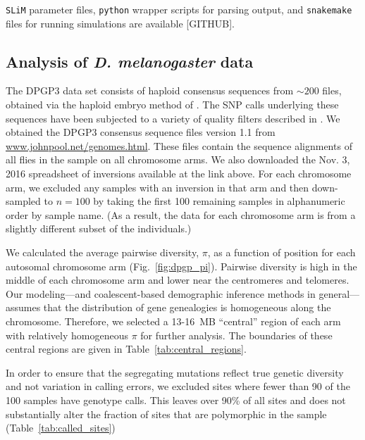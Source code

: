 \documentclass[11pt, letterpaper]{article}   	%
\newcommand{\fig}[1]{Fig.~\ref{#1}}
\begin{document}
\texttt{SLiM} parameter files, \texttt{python} wrapper scripts for parsing output, and \texttt{snakemake} files for running simulations are available [GITHUB].

\subsection*{Analysis of \textit{D. melanogaster} data}

The DPGP3 data set consists of haploid consensus sequences from $\sim 200$ files, obtained via the haploid embryo method of \cite{LangleyEtal2011}.
The SNP calls underlying these sequences have been subjected to a variety of quality filters described in \cite{LackEtAl2015}.
We obtained the DPGP3 consensus sequence files version 1.1 from \url{www.johnpool.net/genomes.html}.
These files contain the sequence alignments of all flies in the sample on all chromosome arms.
We also downloaded the Nov. 3, 2016 spreadsheet of inversions available at the link above.
For each chromosome arm, we excluded any samples with an inversion in that arm and then down-sampled to $n=100$ by taking the first 100 remaining samples in alphanumeric order by sample name.
(As a result, the data for each chromosome arm is from a slightly different subset of the individuals.)

We calculated the average pairwise diversity, $\pi$, as a function of position for each autosomal chromosome arm (\fig{fig:dpgp_pi}).
Pairwise diversity is high in the middle of each chromosome arm and lower near the centromeres and telomeres.
Our modeling---and coalescent-based demographic inference methods in general---assumes that the distribution of gene genealogies is homogeneous along the chromosome.
Therefore, we selected a 13-16~MB ``central'' region of each arm with relatively homogeneous $\pi$ for further analysis.
The boundaries of these central regions are given in Table~\ref{tab:central_regions}.

In order to ensure that the segregating mutations reflect true genetic diversity and not variation in calling errors, we excluded sites where fewer than 90 of the 100 samples have genotype calls.
This leaves over 90\% of all sites and does not substantially alter the fraction of sites that are polymorphic in the sample (Table~\ref{tab:called_sites})
\end{document}
